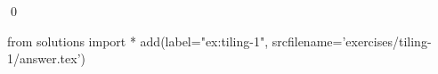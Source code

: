\begin{ex}
  \label{ex:tiling-1}
  
  \qed
\end{ex}
\begin{python0}
from solutions import *
add(label="ex:tiling-1",
    srcfilename='exercises/tiling-1/answer.tex') 
\end{python0}                              
